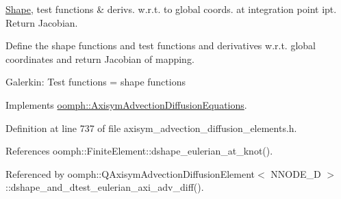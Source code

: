 \hyperlink{classoomph_1_1Shape}{Shape}, test functions \& derivs. w.\+r.\+t. to global coords. at integration point ipt. Return Jacobian. 

Define the shape functions and test functions and derivatives w.\+r.\+t. global coordinates and return Jacobian of mapping.

Galerkin\+: Test functions = shape functions 

Implements \hyperlink{classoomph_1_1AxisymAdvectionDiffusionEquations_a6d844cf194aa8fa462bbfcda811b24ca}{oomph\+::\+Axisym\+Advection\+Diffusion\+Equations}.



Definition at line 737 of file axisym\+\_\+advection\+\_\+diffusion\+\_\+elements.\+h.



References oomph\+::\+Finite\+Element\+::dshape\+\_\+eulerian\+\_\+at\+\_\+knot().



Referenced by oomph\+::\+Q\+Axisym\+Advection\+Diffusion\+Element$<$ N\+N\+O\+D\+E\+\_\+D $>$\+::dshape\+\_\+and\+\_\+dtest\+\_\+eulerian\+\_\+axi\+\_\+adv\+\_\+diff().

\mbox{\label{classoomph_1_1QAxisymAdvectionDiffusionElement_aa940ad09f185dfde0eaeff61bc9c0a31}} 
